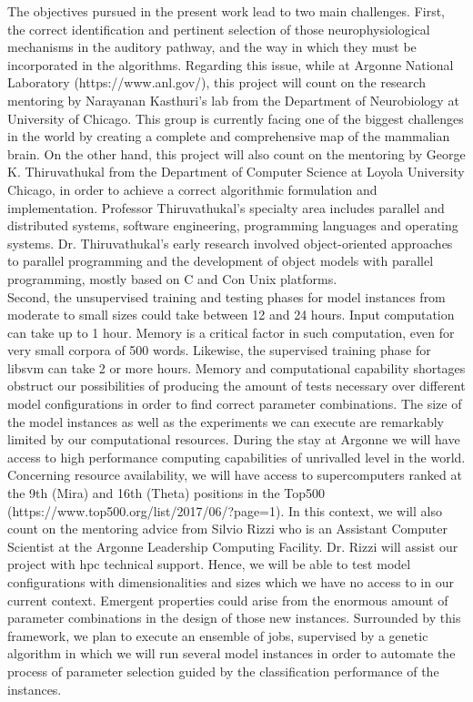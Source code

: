 \documentclass[11pt,a4paper]{article}
\newcommand{\CC}{C\nolinebreak\hspace{-.05em}\raisebox{.4ex}{\tiny\bf +}\nolinebreak\hspace{-.10em}\raisebox{.4ex}{\tiny\bf +}}
\begin{document}
The objectives pursued in the present work lead to two main challenges.
First, the correct identification and pertinent selection of those neurophysiological
mechanisms in the auditory pathway, and the way in which they must be incorporated
in the algorithms.
Regarding this issue, while at Argonne National Laboratory (https://www.anl.gov/),
this project will count on the
research mentoring by Narayanan Kasthuri's lab
from the Department of Neurobiology at University of Chicago.
This group is currently facing one of the biggest challenges in the world by 
creating a complete and comprehensive map of the mammalian brain.
On the other hand, this project will also count on the mentoring by
George K. Thiruvathukal from the Department of Computer Science at
Loyola University Chicago,
in order to achieve a correct algorithmic formulation and implementation.
Professor Thiruvathukal's specialty area includes
parallel and distributed systems, software engineering, programming languages and operating systems.
Dr. Thiruvathukal's early research involved object-oriented approaches to parallel programming
and the development of object models with parallel programming, mostly based on C and \CC  on Unix platforms. \\

Second, the
unsupervised training and testing phases for model instances from moderate to small sizes
could take between 12 and 24 hours.
Input computation can take up to 1 hour.
Memory is a critical factor in such computation,
even for very small corpora of 500 words.
Likewise, the supervised training phase for \gls{libsvm} can take 2 or more hours.
Memory and computational capability shortages obstruct our possibilities of producing
the amount of tests necessary over different model configurations in order to find correct
parameter combinations.
The size of the model instances as well as the experiments we can execute
are remarkably limited by our computational resources.
During the stay at Argonne we will have access
to high performance computing capabilities of unrivalled level in the world.
Concerning resource availability, we will have access to supercomputers
ranked at the 9th (Mira) and 16th (Theta) positions in the Top500
(https://www.top500.org/list/2017/06/?page=1).
In this context, we will also count on the mentoring advice from Silvio Rizzi
who is an Assistant Computer Scientist at the Argonne Leadership Computing Facility.
Dr. Rizzi will assist our project with \gls{hpc} technical support.
Hence, we will be able to test model configurations
with dimensionalities and sizes which we have no access to in our current context.
Emergent properties could arise from the enormous amount of parameter combinations in the design
of those new instances.
Surrounded by this framework, we plan to execute an ensemble of jobs,
supervised by a genetic algorithm in which we will run several model instances
in order to automate the process of parameter selection guided by the
classification performance of the instances. \\
\end{document}

